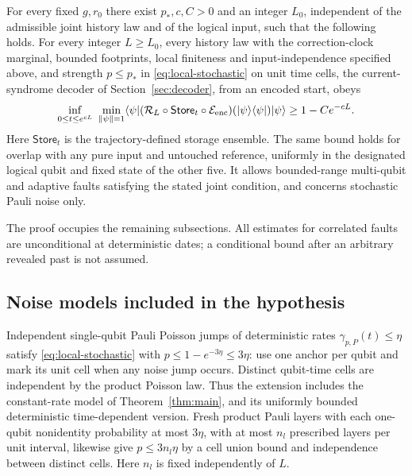 \begin{theorem}\label{thm:correlated}
For every fixed \(g,r_0\) there exist \(p_*,c,C>0\) and an integer
\(L_0\), independent of the admissible joint history law and of
the logical input, such that the following holds. For every integer
\(L\ge L_0\), every history law with the correction-clock marginal,
bounded footprints, local finiteness and input-independence
specified above, and strength \(p\le p_*\) in
\eqref{eq:local-stochastic} on unit time cells, the current-syndrome
decoder of Section~\ref{sec:decoder}, from an encoded start, obeys
\begin{equation}\label{eq:correlated-memory}
 \inf_{0\le t\le e^{cL}}\
 \min_{\|\psi\|=1}
 \langle\psi|(\mathcal R_L\circ\mathsf{Store}_t\circ\mathcal E_{\rm enc})
       (|\psi\rangle\langle\psi|)|\psi\rangle
       \ge1-Ce^{-cL}.
\end{equation}
Here \(\mathsf{Store}_t\) is the trajectory-defined storage ensemble.
The same bound holds for overlap with any pure input and untouched
reference, uniformly in the designated logical qubit and fixed state
of the other five. It allows bounded-range multi-qubit and adaptive
faults satisfying the stated joint condition, and concerns
stochastic Pauli noise only.
\end{theorem}

The proof occupies the remaining subsections. All estimates for
correlated faults are unconditional at deterministic dates; a
conditional bound after an arbitrary revealed past is not assumed.

\subsection{Noise models included in the hypothesis}

Independent single-qubit Pauli Poisson jumps of deterministic rates
\(\gamma_{p,P}(t)\le\eta\) satisfy
\eqref{eq:local-stochastic} with \(p\le1-e^{-3\eta}\le3\eta\):
use one anchor per qubit and mark its unit cell when any noise
jump occurs. Distinct qubit-time cells are independent by the
product Poisson law. Thus the extension includes the constant-rate
model of Theorem~\ref{thm:main}, and its uniformly bounded
deterministic time-dependent version. Fresh product Pauli layers
with each one-qubit nonidentity probability at most \(3\eta\),
with at most \(n_l\) prescribed layers per unit interval, likewise
give \(p\le3n_l\eta\) by a cell union bound and independence between
distinct cells. Here \(n_l\) is fixed independently of \(L\).

